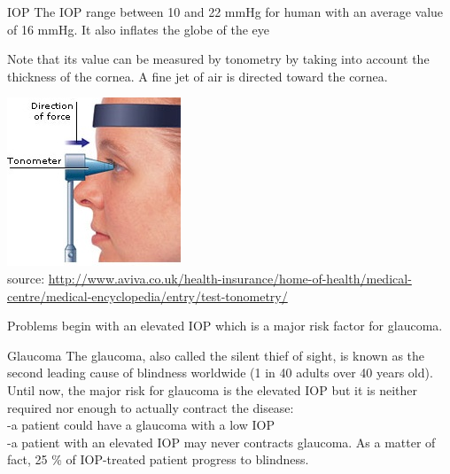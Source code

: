 \documentclass[9pt]{beamer}
\begin{document}
\begin{frame}{IOP}
The IOP range between 10 and 22 mmHg for human with an average value of 16 mmHg.
It also inflates the globe of the eye

Note that its value can be measured by tonometry by taking into account the thickness of the cornea. A fine jet of air is directed toward the cornea.
\begin{center}
\includegraphics[scale=.6]{Tonometry.jpg}\\
\tiny{source: \url{http://www.aviva.co.uk/health-insurance/home-of-health/medical-centre/medical-encyclopedia/entry/test-tonometry/}}
\end{center}
Problems begin with an elevated IOP which is a major risk factor for glaucoma.
\end{frame}

\begin{frame}{Glaucoma}
The glaucoma, also called the silent thief of sight, is known as the second leading cause of blindness worldwide (1 in 40 adults over 40 years old).
\newline
\\
 Until now, the major risk for glaucoma is the elevated IOP but it is neither required nor enough to actually contract the disease:\\
-a patient could have a glaucoma with a low IOP\\
-a patient with an elevated IOP may never contracts glaucoma. 
As a matter of fact, 25 \% of IOP-treated patient progress to blindness.

\end{frame}
\end{document}
